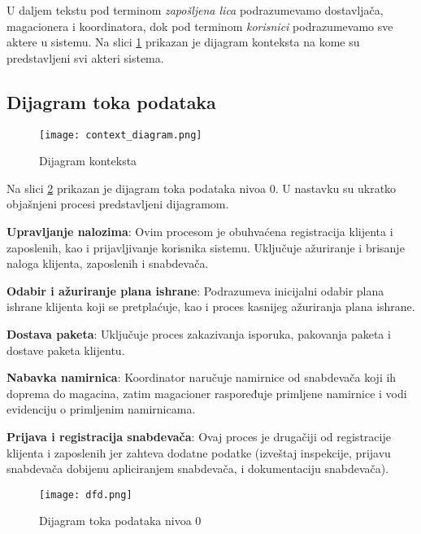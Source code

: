\begin{itemize}
		U daljem tekstu pod terminom \textit{zapošljena lica} podrazumevamo dostavljača, magacionera i koordinatora, dok pod terminom \textit{korisnici} podrazumevamo sve aktere u sistemu. Na slici \ref{fig:context_diagram} prikazan je dijagram konteksta na kome su predstavljeni svi akteri sistema.
		
				
	\end{itemize}
\subsection{Dijagram toka podataka}

\begin{figure}[H]
	\begin{center}
		\texttt{[image: context\_diagram.png]}

	    \caption{Dijagram konteksta}
	\label{fig:context_diagram}
    \end{center}
    
\end{figure}

	Na slici \ref{fig:DFD} prikazan je dijagram toka podataka nivoa 0. U nastavku su ukratko objašnjeni procesi predstavljeni dijagramom.
	
	
	\textbf{Upravljanje nalozima}: Ovim procesom je obuhvaćena registracija klijenta i zaposlenih, kao i prijavljivanje korisnika sistemu. Uključuje ažuriranje i brisanje naloga klijenta, zaposlenih i snabdevača.
	
	\textbf{Odabir i ažuriranje plana ishrane}: Podrazumeva inicijalni odabir plana ishrane klijenta koji se pretplaćuje, kao i proces kasnijeg ažuriranja plana ishrane.
		
	\textbf{Dostava paketa}: Uključuje proces zakazivanja isporuka, pakovanja paketa i dostave paketa klijentu. 
	
	
	\textbf{Nabavka namirnica}: Koordinator naručuje namirnice od snabdevača koji ih doprema do magacina, zatim magacioner raspoređuje primljene namirnice i vodi evidenciju o primljenim namirnicama.
	
	
	\textbf{Prijava i registracija snabdevača}: Ovaj proces je drugačiji od registracije klijenta i zaposlenih jer zahteva dodatne podatke (izveštaj inspekcije, prijavu snabdevača dobijenu apliciranjem snabdevača, i dokumentaciju snabdevača).


\begin{figure}[H]
	\begin{center}
		\texttt{[image: dfd.png]}

    		\caption{Dijagram toka podataka nivoa 0}
    \label{fig:DFD}
    \end{center}
 
\end{figure}

	
